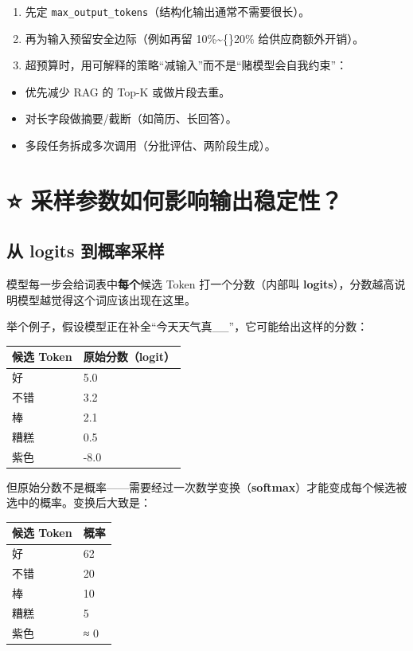 \documentclass[10pt,a4paper]{ctexart}
\begin{document}
\begin{enumerate}[itemsep=2pt, topsep=4pt]
  \item 先定 \texttt{max\_output\_tokens}（结构化输出通常不需要很长）。
  \item 再为输入预留安全边际（例如再留 10\%\textasciitilde\{\}20\% 给供应商额外开销）。
  \item 超预算时，用可解释的策略“减输入”而不是“赌模型会自我约束”：
\end{enumerate}
\begin{itemize}[itemsep=2pt, topsep=4pt]
  \item 优先减少 RAG 的 Top-K 或做片段去重。
  \item 对长字段做摘要/截断（如简历、长回答）。
  \item 多段任务拆成多次调用（分批评估、两阶段生成）。
\end{itemize}


\section{⭐️ 采样参数如何影响输出稳定性？}


\subsection{从 logits 到概率采样}


模型每一步会给词表中\textbf{每个}候选 Token 打一个分数（内部叫 \textbf{logits}），分数越高说明模型越觉得这个词应该出现在这里。



举个例子，假设模型正在补全“今天天气真\_\_”，它可能给出这样的分数：


{\footnotesize
\begin{tabularx}{\textwidth}{|X|X|}
\hline
\textbf{候选 Token} & \textbf{原始分数（logit）} \\
\hline
好 & 5.0 \\
\hline
不错 & 3.2 \\
\hline
棒 & 2.1 \\
\hline
糟糕 & 0.5 \\
\hline
紫色 & -8.0 \\
\hline
\end{tabularx}
}



但原始分数不是概率——需要经过一次数学变换（\textbf{softmax}）才能变成每个候选被选中的概率。变换后大致是：


{\footnotesize
\begin{tabularx}{\textwidth}{|X|X|}
\hline
\textbf{候选 Token} & \textbf{概率} \\
\hline
好 & 62\\%
\hline
不错 & 20\\%
\hline
棒 & 10\\%
\hline
糟糕 & 5\\%
\hline
紫色 & ≈ 0\\%
\hline
\end{tabularx}
}
\end{document}
